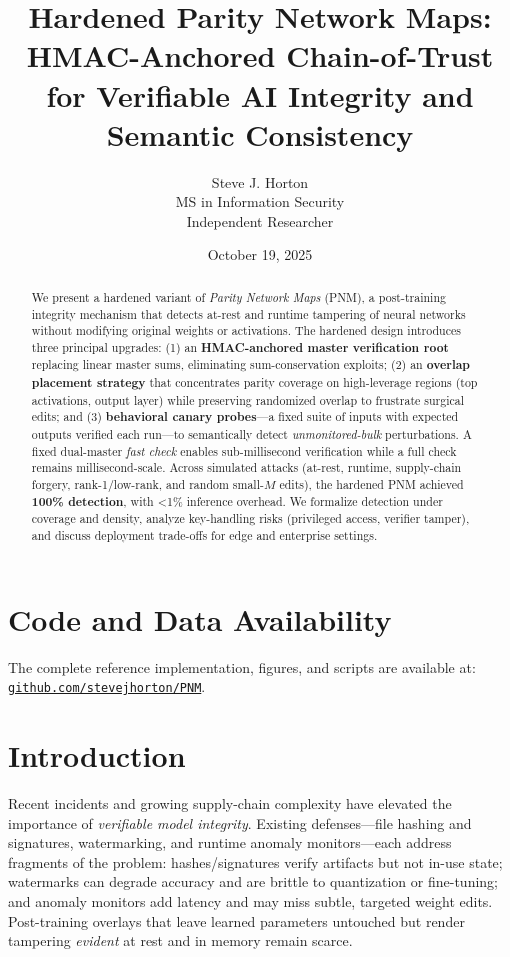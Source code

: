 \documentclass[11pt]{article}
\title{Hardened Parity Network Maps: HMAC-Anchored Chain-of-Trust for Verifiable AI Integrity and Semantic Consistency}
\author{Steve J. Horton \\ MS in Information Security \\ Independent Researcher}
\date{October 19, 2025}
\begin{document}
\maketitle

\begin{abstract}
We present a hardened variant of \emph{Parity Network Maps} (PNM), a post-training integrity mechanism that detects at-rest and runtime tampering of neural networks without modifying original weights or activations. The hardened design introduces three principal upgrades: (1) an \textbf{HMAC-anchored master verification root} replacing linear master sums, eliminating sum-conservation exploits; (2) an \textbf{overlap placement strategy} that concentrates parity coverage on high-leverage regions (top activations, output layer) while preserving randomized overlap to frustrate surgical edits; and (3) \textbf{behavioral canary probes}---a fixed suite of inputs with expected outputs verified each run---to semantically detect \emph{unmonitored-bulk} perturbations. A fixed dual-master \emph{fast check} enables sub-millisecond verification while a full check remains millisecond-scale. Across simulated attacks (at-rest, runtime, supply-chain forgery, rank-1/low-rank, and random small-$M$ edits), the hardened PNM achieved \textbf{100\% detection}, with \textless1\% inference overhead. We formalize detection under coverage and density, analyze key-handling risks (privileged access, verifier tamper), and discuss deployment trade-offs for edge and enterprise settings.
\end{abstract}

\section*{Code and Data Availability}
The complete reference implementation, figures, and scripts are available at: \href{https://github.com/stevejhorton/PNM}{\texttt{github.com/stevejhorton/PNM}}.

\section{Introduction}
Recent incidents and growing supply-chain complexity have elevated the importance of \emph{verifiable model integrity}. Existing defenses---file hashing and signatures, watermarking, and runtime anomaly monitors---each address fragments of the problem: hashes/signatures verify artifacts but not in-use state; watermarks can degrade accuracy and are brittle to quantization or fine-tuning; and anomaly monitors add latency and may miss subtle, targeted weight edits. Post-training overlays that leave learned parameters untouched but render tampering \emph{evident} at rest and in memory remain scarce.
\end{document}
